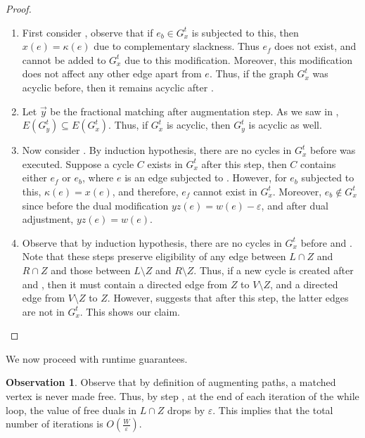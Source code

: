\documentclass[a4paper,11pt]{article}
\newcommand{\eps}{\varepsilon}
\theoremstyle{definition}
\theoremstyle{definition}
\theoremstyle{definition}
\theoremstyle{definition}
\theoremstyle{definition}
\theoremstyle{definition}
\theoremstyle{definition}
\newtheorem{observation2}[definition2]{Observation}
\theoremstyle{definition}
\theoremstyle{definition}
\theoremstyle{definition}
\theoremstyle{definition}
\theoremstyle{definition}
\theoremstyle{definition}
\theoremstyle{definition}
\theoremstyle{definition}
\begin{document}
\begin{proof}
\begin{enumerate}
    \item First consider , observe that if $e_b\in G^t_x$ is subjected to this, then $x(e)=\kappa(e)$ due to complementary slackness. Thus $e_f$ does not exist, and cannot be added to $G^t_x$ due to this modification. Moreover, this modification does not affect any other edge apart from $e$. Thus, if the graph $G^t_x$ was acyclic before, then it remains acyclic after .
    \item Let $\vec{y}$ be the fractional matching after augmentation step. As we saw in , $E(G^t_y)\subseteq E(G^t_x)$. Thus, if $G^t_x$ is acyclic, then $G^t_y$ is acyclic as well.
    \item Now consider . By induction hypothesis, there are no cycles in $G^t_x$ before  was executed. Suppose a cycle $C$ exists in $G^t_x$ after this step, then $C$ contains either $e_f$ or $e_b$, where $e$ is an edge subjected to . However, for $e_b$ subjected to this, $\kappa(e)=x(e)$, and therefore, $e_f$ cannot exist in $G^t_x$. Moreover, $e_b\notin G^t_x$ since before the dual modification $yz(e)=w(e)-\eps$, and after dual adjustment, $yz(e)=w(e)$.
    \item Observe that by induction hypothesis, there are no cycles in $G^t_x$ before  and . Note that these steps preserve eligibility of any edge between $L\cap Z$ and $R\cap Z$ and those between $L\setminus Z$ and $R\setminus Z$. Thus, if a new cycle is created after  and , then it must contain a directed edge from $Z$ to $V\setminus Z$, and a directed edge from $V\setminus Z$ to $Z$. However,  suggests that after this step, the latter edges are not in $G^t_x$. This shows our claim.
\end{enumerate}
\end{proof}

We now proceed with runtime guarantees.

\begin{observation2}\label{obs:iterations}
    Observe that by definition of augmenting paths, a matched vertex is never made free. Thus, by step , at the end of each iteration of the while loop, the value of free duals in $L\cap Z$ drops by $\eps$. This implies that the total number of iterations is $O(\frac{W}{\eps})$.
\end{observation2}
\end{document}
